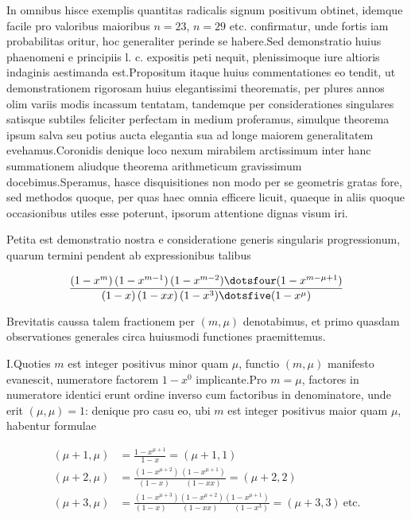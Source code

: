 
In omnibus hisce exemplis quantitas radicalis signum positivum obtinet, idemque facile pro valoribus maioribus $n=23$, $n=29$ etc. confirmatur, unde fortis iam probabilitas oritur, hoc generaliter perinde se habere.\quad Sed demonstratio huius phaenomeni e principiis l. c. expositis peti nequit, plenissimoque iure altioris indaginis aestimanda est.\quad Propositum itaque huius commentationes eo tendit, ut demonstrationem rigorosam huius elegantissimi theorematis, per plures annos olim variis modis incassum tentatam, tandemque per considerationes singulares satisque subtiles feliciter perfectam in medium proferamus, simulque theorema ipsum salva seu potius aucta elegantia sua ad longe maiorem generalitatem evehamus.\quad Coronidis denique loco nexum mirabilem arctissimum inter hanc summationem aliudque theorema arithmeticum gravissimum docebimus.\quad Speramus, hasce disquisitiones non modo per se geometris gratas fore, sed methodos quoque, per quas haec omnia efficere licuit, quaeque in aliis quoque occasionibus utiles esse poterunt, ipsorum attentione dignas visum iri.


Petita est demonstratio nostra e consideratione generis singularis progressionum, quarum termini pendent ab expressionibus talibus

\[
\begin{aligned}
\frac{(1-x^m)\,(1-x^{m-1})\,(1-x^{m-2})\dotsfour(1-x^{m-\mu+1})}{(1-x)\,(1-xx)\,(1-x^3)\dotsfive(1-x^\mu)}
\end{aligned}
\]

Brevitatis caussa talem fractionem per $(m,\mu)$ denotabimus, et primo quasdam observationes generales circa huiusmodi functiones praemittemus.

I.\quad Quoties $m$ est integer positivus minor quam $\mu$, functio $(m,\mu)$ manifesto evanescit, numeratore factorem $1-x^0$ implicante.\quad Pro $m=\mu$, factores in numeratore identici erunt ordine inverso cum factoribus in denominatore, unde erit $(\mu,\mu)=1$: denique pro casu eo, ubi $m$ est integer positivus maior quam $\mu$, habentur formulae

\[
\begin{aligned}
(\mu+1,\mu)&=\frac{1-x^{\mu+1}}{1-x}=(\mu+1,1)\\
(\mu+2,\mu)&=\frac{(1-x^{\mu+2})\,(1-x^{\mu+1})}{(1-x)\qquad(1-xx)}=(\mu+2,2)\\
(\mu+3,\mu)&=\frac{(1-x^{\mu+3})(1-x^{\mu+2})(1-x^{\mu+1})}{(1-x)\qquad(1-xx)\qquad(1-x^3)}=(\mu+3,3)\ \text{etc.}
\end{aligned}
\]


